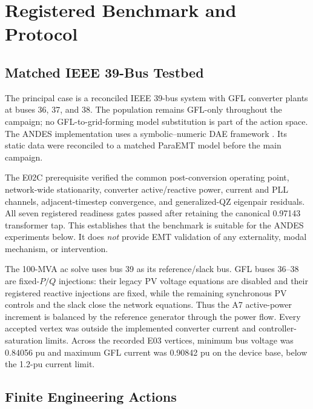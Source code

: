 \section{Registered Benchmark and Protocol}
\subsection{Matched IEEE 39-Bus Testbed}

The principal case is a reconciled IEEE 39-bus system with GFL converter
plants at buses 36, 37, and 38. The population remains GFL-only throughout the
campaign; no GFL-to-grid-forming model substitution is part of the action
space. The ANDES implementation uses a symbolic--numeric DAE framework
\cite{cui2021andes}. Its static data were reconciled to a matched ParaEMT
model before the main campaign.

The E02C prerequisite verified the common post-conversion operating point,
network-wide stationarity, converter active/reactive power, current and PLL
channels, adjacent-timestep convergence, and generalized-QZ eigenpair
residuals. All seven registered readiness gates passed after retaining the
canonical 0.97143 transformer tap. This establishes that the benchmark is
suitable for the ANDES experiments below. It does \emph{not} provide EMT
validation of any externality, modal mechanism, or intervention.

The 100-MVA ac solve uses bus 39 as its reference/slack bus. GFL buses 36--38
are fixed-$P/Q$ injections: their legacy PV voltage equations are disabled and
their registered reactive injections are fixed, while the remaining
synchronous PV controls and the slack close the network equations. Thus the
A7 active-power increment is balanced by the reference generator through the
power flow. Every accepted vertex was outside the implemented converter
current and controller-saturation limits. Across the recorded E03 vertices,
minimum bus voltage was 0.84056 pu and maximum GFL current was 0.90842 pu on
the device base, below the 1.2-pu current limit.

\subsection{Finite Engineering Actions}

